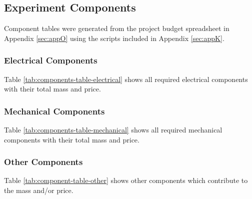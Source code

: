 \begin{landscape}
\subsection{Experiment Components} \label{components}
\label{sec:experiment-components}

Component tables were generated from the project budget spreadsheet in Appendix \ref{sec:appO} using the scripts included in Appendix \ref{sec:appK}. 

\subsubsection{Electrical Components}

Table \ref{tab:components-table-electrical} shows all required electrical components with their total mass and price.\\



\end{landscape}

\begin{landscape}

\subsubsection{Mechanical Components}

Table \ref{tab:components-table-mechanical} shows all required mechanical components with their total mass and price.\\




\raggedbottom
\end{landscape}

\begin{landscape}
\subsubsection{Other Components}
Table \ref{tab:component-table-other} shows other components which contribute to the mass and/or price.\\




\raggedbottom
\end{landscape}